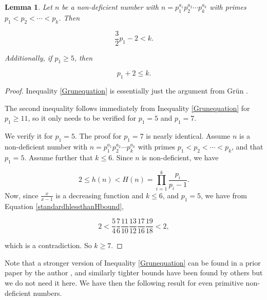 \documentclass[12pt,reqno]{article}
\theoremstyle{plain}
\newtheorem{lemma}[theorem]{Lemma}
\theoremstyle{definition}
\theoremstyle{remark}
\begin{document}
\begin{lemma} Let $n$ be a non-deficient number with $n= p_1^{a_1}p_2^{a_2} \cdots p_k^{a_k}$ with primes $p_1 < p_2 < \cdots < p_k$. Then

\begin{equation} \frac{3}{2}p_1 -2 <  k. \label{Grunequation}
\end{equation}

Additionally, if $p_1 \geq 5$, then 

\begin{equation} p_1 +2 \leq k. \label{Grunlikeneededotherinequality}
\end{equation}

\label{Grun}
\end{lemma}
\begin{proof} Inequality \eqref{Grunequation} is essentially just the argument from Gr{\"u}n  \cite{Grun}.

The second inequality follows immediately from   Inequality \eqref{Grunequation} for $p_1 \geq 11$, so it only needs to be verified for $p_1=5$ and $p_1=7$.

We verify it for $p_1=5$. The proof for $p_1=7$ is nearly identical. Assume $n$ is a non-deficient number with $n= p_1^{a_1}p_2^{a_2} \cdots p_k^{a_k}$ with primes $p_1 < p_2 < \cdots < p_k$, and that $p_1=5$. Assume further that $k \leq 6$. Since $n$ is non-deficient, we have

\begin{equation}
    2 \leq h(n) < H(n) = \prod_{i=1}^k \frac{p_i}{p_i-1}. \label{standardhlessthanHbound}
\end{equation}
Now, since $\frac{x}{x-1}$ is a decreasing function and $k \leq 6$, and $p_1=5$, we have from Equation \eqref{standardhlessthanHbound},

\begin{equation}
    2 < \frac{5}{4}\frac{7}{6}\frac{11}{10}\frac{13}{12}\frac{17}{16}\frac{19}{18} < 2,
\end{equation}

which is a contradiction. So $k \geq 7$.
\end{proof}

Note that a stronger version of Inequality \eqref{Grunequation} can be found in a prior paper by the author \cite{Zelinskybig}, and similarly tighter bounds have been found by others \cite{AslaskenKirfel, Stone}  but we do not need it here. We have then the following result for even primitive non-deficient numbers. 
\end{document}
